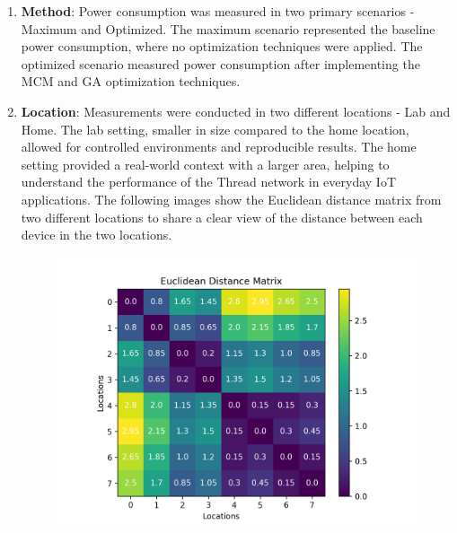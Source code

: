 \begin{enumerate}
    \item \textbf{Method}: Power consumption was measured in two primary scenarios - Maximum and Optimized. The maximum scenario represented the baseline power consumption, where no optimization techniques were applied. The optimized scenario measured power consumption after implementing the \gls{MCM} and \gls{GA} optimization techniques.
    \item \textbf{Location}: Measurements were conducted in two different locations - Lab and Home. The lab setting, smaller in size compared to the home location, allowed for controlled environments and reproducible results. The home setting provided a real-world context with a larger area, helping to understand the performance of the Thread network in everyday \gls{IoT} applications. The following images show the Euclidean distance matrix from two different locations to share a clear view of the distance between each device in the two locations.
    \begin{figure}[H]
        \centering
        \begin{minipage}{0.5\textwidth}
            \centering
            \includegraphics[width=1\textwidth]{images/research_design/distance_matrix_lab.png}
            \label{fig:distance_matrix_lab}
        \end{minipage}%
        \begin{minipage}{0.5\textwidth}
            \centering

\end{minipage}
\end{figure}
\end{enumerate}
